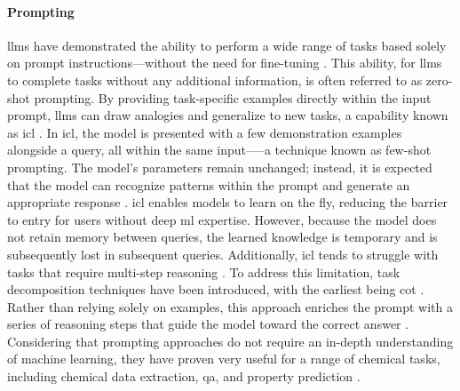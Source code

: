 


\paragraph{Prompting}\label{sec:prompting} \glspl{llm} have demonstrated the ability to perform a wide range of tasks based solely on prompt instructions---without the need for fine-tuning \autocite{radford2019language}. 
This ability, for \glspl{llm} to complete tasks without any additional information, is often referred to as zero-shot prompting.
By providing task-specific examples directly within the input prompt, \glspl{llm} can draw analogies and generalize to new tasks, a capability known as \gls{icl} \autocite{brown2020language, chowdhery2023palm, openai2023gpt04}. 
In \gls{icl}, the model is presented with a few demonstration examples alongside a query, all within the same input—--a technique known as few-shot prompting. 
The model's parameters remain unchanged; instead, it is expected that the model can recognize patterns within the prompt and generate an appropriate response \autocite{von2023transformers}. \gls{icl} enables models to learn on the fly, reducing the barrier to entry for users without deep \gls{ml} expertise. 
However, because the model does not retain memory between queries, the learned knowledge is temporary and is subsequently lost in subsequent queries. 
Additionally, \gls{icl} tends to struggle with tasks that require multi-step reasoning \autocite{brown2020language}. 
To address this limitation, task decomposition techniques have been introduced, with the earliest being \gls{cot} \autocite{wei2022chain}. 
Rather than relying solely on examples, this approach enriches the prompt with a series of reasoning steps that guide the model toward the correct answer \autocite{wei2022chain}. 
Considering that prompting approaches do not require an in-depth understanding of machine learning, they have proven very useful for a range of chemical tasks, including chemical data extraction, \gls{qa}, and property prediction \autocite{liu2025integrating, zheng2023chatgpt, mirza2024large, ramos2023bayesian}.


